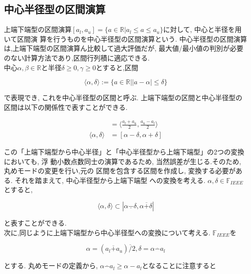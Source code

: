 \documentclass[11pt,a4paper]{jsreport}
\theoremstyle{definition}
\begin{document}
\subsection{中心半径型の区間演算}
  上端下端型の区間演算$[a_l,a_u] = \{a \in \mathbb{R} | a_l \leq a \leq a_u\}$に対して, 中心と半径を用いて区間演
算を行うものを中心半径型の区間演算という. 中心半径型の区間演算は,上端下端型の区間演算ん比較して過大評価だが, 最大値/最小値の判別が必要のない計算方法であり,区間行列積に適応できる. \\
\indent 中心$\alpha,\beta \in \mathbb{R}$と半径$\delta \geq 0,\gamma \geq 0$とすると,区間

\begin{equation*}
\langle \alpha,\delta \rangle := \{a \in \mathbb{R}| |a - \alpha| \leq \delta\}
\end{equation*}

\noindent で表現でき, これを中心半径型の区間と呼ぶ. 上端下端型の区間と中心半径型の区間は以下の関係性で表すことができる.

  \begin{align*}
    [a_l,a_u] &= \langle \frac{a_l + a_u}{2},\frac{a_u - a_l}{2} \rangle \\
    \langle \alpha,\delta \rangle &= [\alpha - \delta,\alpha + \delta]
  \end{align*}

この「上端下端型から中心半径」と「中心半径型から上端下端型」の2つの変換においても, 浮
動小数点数同士の演算であるため, 当然誤差が生じる.そのため, 丸めモードの変更を行い,元の
区間を包含する区間を作成し, 変換する必要がある. それを踏まえて, 中心半径型から上端下端型
への変換を考える. $\alpha,\delta \in \mathbb{F}_{IEEE}$とすると,

\begin{equation*}
  \langle \alpha,\delta \rangle \subset |\alpha \underline{-} \delta,\alpha \overline{+} \delta|
\end{equation*}

\noindent と表すことができる. \\
  次に,同じように上端下端型から中心半径型への変換について考える.
  $\mathbb{F}_{IEEE}$を

  \begin{equation*}
    \alpha = (a_l \overline{+} a_u) \overline{/} 2,\delta = \alpha \overline{-} a_l
  \end{equation*}

とする.
  丸めモードの定義から, $\alpha \overline{-} a_l \geq \alpha -a_l$となることに注意すると
\end{document}
